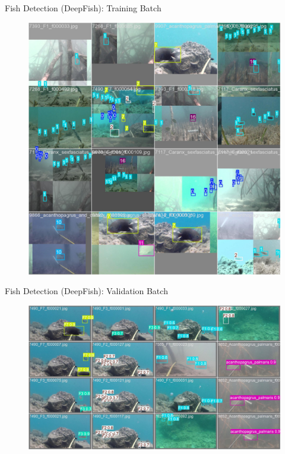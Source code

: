 \documentclass[serif]{beamer}  %
\begin{document}
\begin{frame}{Fish Detection (DeepFish): Training Batch}

\begin{figure}
    \centering
    \includegraphics[width=0.60\linewidth]{images/train_batch2.jpg}
\end{figure}
    
\end{frame}


\begin{frame}{Fish Detection (DeepFish): Validation Batch}

\begin{figure}
    \centering
    \includegraphics[width=0.8\linewidth]{images/val_batch1_pred.jpg}
\end{figure}
    
\end{frame}
\end{document}
